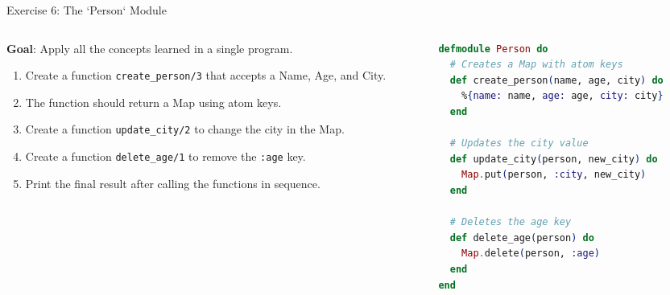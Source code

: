 \documentclass[aspectratio=169, table]{beamer}
\begin{document}
\begin{frame}[fragile]{Exercise 6: The `Person` Module}
\vspace{15pt}
\begin{columns}
    \begin{column}[T]{0.45\textwidth}
        \textbf{Goal}: Apply all the concepts learned in a single program.
        \begin{enumerate}
            \item Create a function \texttt{create\_person/3} that accepts a Name, Age, and City.
            \item The function should return a Map using atom keys.
            \item Create a function \texttt{update\_city/2} to change the city in the Map.
            \item Create a function \texttt{delete\_age/1} to remove the \texttt{:age} key.
            \item Print the final result after calling the functions in sequence.
        \end{enumerate}

    \end{column}

    \begin{column}[T]{0.55\textwidth}
        \begin{lstlisting}[language=Elixir, basicstyle=\ttfamily\footnotesize]
defmodule Person do
  # Creates a Map with atom keys
  def create_person(name, age, city) do
    %{name: name, age: age, city: city}
  end

  # Updates the city value
  def update_city(person, new_city) do
    Map.put(person, :city, new_city)
  end

  # Deletes the age key
  def delete_age(person) do
    Map.delete(person, :age)
  end
end
        \end{lstlisting}
    \end{column}
\end{columns}
\end{frame}
\end{document}
